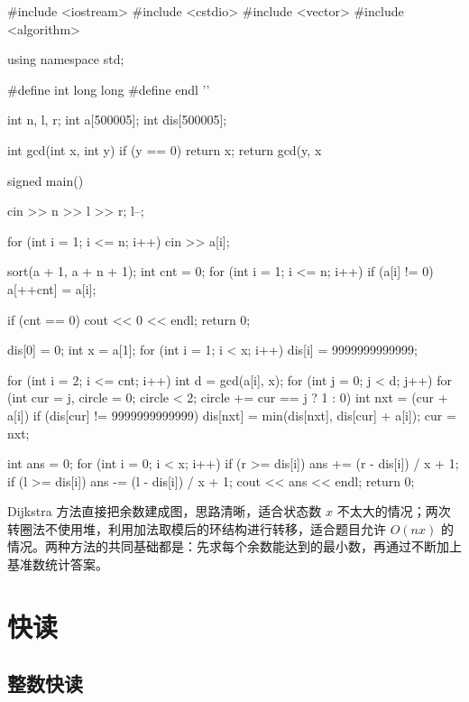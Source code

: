 \documentclass[UTF8,a4paper,11pt]{ctexart}
\newcommand{\topic}[1]{%
  \par\needspace{3\baselineskip}\vspace{0.45em}%
  \noindent{\bfseries\color{Primary}#1}\par\vspace{0.12em}%
}
\begin{document}
\begin{CodeBlock}
#include <iostream>
#include <cstdio>
#include <vector>
#include <algorithm>

using namespace std;

#define int long long
#define endl '\n'

int n, l, r;
int a[500005];
int dis[500005];

int gcd(int x, int y) {
    if (y == 0)
        return x;
    return gcd(y, x %
}

signed main() {
    cin >> n >> l >> r;
    l--;

    for (int i = 1; i <= n; i++)
        cin >> a[i];

    sort(a + 1, a + n + 1);
    int cnt = 0;
    for (int i = 1; i <= n; i++) {
        if (a[i] != 0)
            a[++cnt] = a[i];
    }

    if (cnt == 0) {
        cout << 0 << endl;
        return 0;
    }

    dis[0] = 0;
    int x = a[1];
    for (int i = 1; i < x; i++)
        dis[i] = 9999999999999;

    for (int i = 2; i <= cnt; i++) {
        int d = gcd(a[i], x);
        for (int j = 0; j < d; j++) {
            for (int cur = j, circle = 0;
                 circle < 2;
                 circle += cur == j ? 1 : 0) {
                int nxt = (cur + a[i]) %
                if (dis[cur] != 9999999999999)
                    dis[nxt] = min(dis[nxt], dis[cur] + a[i]);
                cur = nxt;
            }
        }
    }

    int ans = 0;
    for (int i = 0; i < x; i++) {
        if (r >= dis[i])
            ans += (r - dis[i]) / x + 1;
        if (l >= dis[i])
            ans -= (l - dis[i]) / x + 1;
    }
    cout << ans << endl;
    return 0;
}
\end{CodeBlock}

\topic{两种方法的区别}

Dijkstra 方法直接把余数建成图，思路清晰，适合状态数 $x$ 不太大的情况；两次转圈法不使用堆，利用加法取模后的环结构进行转移，适合题目允许 $O(nx)$ 的情况。两种方法的共同基础都是：先求每个余数能达到的最小数，再通过不断加上基准数统计答案。

\clearpage
\section{快读}

\subsection{整数快读}
\end{document}
